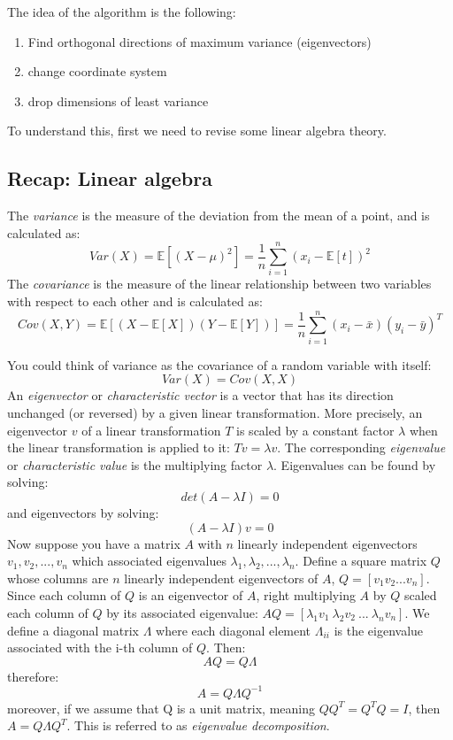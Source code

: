 \documentclass[11pt]{article}
\begin{document}
The idea of the algorithm is the following:

\begin{enumerate}
\def\labelenumi{\arabic{enumi}.}
\tightlist
\item
  Find orthogonal directions of maximum variance (eigenvectors)
\item
  change coordinate system
\item
  drop dimensions of least variance
\end{enumerate}

To understand this, first we need to revise some linear algebra theory.

\subsection{Recap: Linear algebra}\label{recap-linear-algebra}

The \emph{variance} is the measure of the deviation from the mean of a
point, and is calculated as:
\[Var(X)= \mathbb{E}[(X-\mu)^2] =  \frac{1}{n}\sum_{i=1}^n (x_i - \mathbb{E}[t])^2\]
The \emph{covariance} is the measure of the linear relationship between
two variables with respect to each other and is calculated as:
\[Cov(X, Y) = \mathbb{E}[(X- \mathbb{E}[X])(Y - \mathbb{E}[Y])]= \frac{1}{n}\sum_{i=1}^n (x_i - \bar x)(y_i -\bar y)^T\]

You could think of variance as the covariance of a random variable with
itself: \[Var(X)=Cov(X, X)\] An \emph{eigenvector} or
\emph{characteristic vector} is a vector that has its direction
unchanged (or reversed) by a given linear transformation. More
precisely, an eigenvector \(v\) of a linear transformation \(T\) is
scaled by a constant factor \(\lambda\) when the linear transformation
is applied to it: \(Tv = \lambda v\). The corresponding
\emph{eigenvalue} or \emph{characteristic value} is the multiplying
factor \(\lambda\). Eigenvalues can be found by solving:
\[det(A-\lambda I) = 0\] and eigenvectors by solving:
\[(A-\lambda I)v =0\] Now suppose you have a matrix \(A\) with \(n\)
linearly independent eigenvectors \(v_1, v_2, ..., v_n\) which
associated eigenvalues \(\lambda _1, \lambda _2, ..., \lambda _n\).
Define a square matrix \(Q\) whose columns are \(n\) linearly
independent eigenvectors of \(A\), \(Q=[v_1 v_2 ... v_n]\). Since each
column of \(Q\) is an eigenvector of \(A\), right multiplying \(A\) by
\(Q\) scaled each column of \(Q\) by its associated eigenvalue:
\(AQ = [\lambda_1 v_1\ \lambda_2 v_2\ ... \ \lambda _n v_n]\). We define
a diagonal matrix \(\Lambda\) where each diagonal element
\(\Lambda _{ii}\) is the eigenvalue associated with the i-th column of
\(Q\). Then: \[AQ=Q\Lambda\] therefore: \[A = Q\Lambda Q^{-1}\]
moreover, if we assume that Q is a unit matrix, meaning
\(QQ^T = Q^T Q = I\), then \(A = Q\Lambda Q^T\). This is referred to as
\emph{eigenvalue decomposition}.
\end{document}

